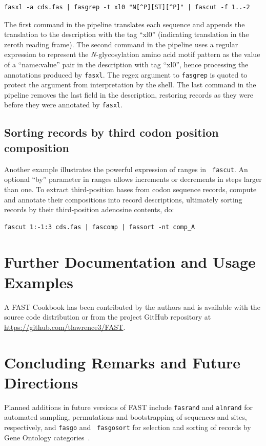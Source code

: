 \documentclass{frontiersSCNS} %
\begin{document}
\begin{verbatim}
fasxl -a cds.fas | fasgrep -t xl0 "N[^P][ST][^P]" | fascut -f 1..-2
\end{verbatim}
 
The first command in the pipeline translates each sequence and appends
the translation to the description with the tag ``xl0'' (indicating
translation in the zeroth reading frame). The second command in the
pipeline uses a regular expression to represent the {\it
  N}-glycosylation amino acid motif pattern as the value of a
``name:value'' pair in the description with tag ``xl0'', hence
processing the annotations produced by {\tt fasxl}. The regex argument
to {\tt fasgrep} is quoted to protect the argument from interpretation
by the shell. The last command in the pipeline removes the last field
in the description, restoring records as they were before they were
annotated by {\tt fasxl}.

\subsection{Sorting records by third codon position composition}

Another example illustrates the powerful expression of ranges in {\tt
  fascut}. An optional ``by'' parameter in ranges allows increments or
decrements in steps larger than one. To extract third-position bases
from codon sequence records, compute and annotate their compositions
into record descriptions, ultimately sorting records by
their third-position adenosine contents, do:

\begin{verbatim}
fascut 1:-1:3 cds.fas | fascomp | fassort -nt comp_A
\end{verbatim}

\section{Further Documentation and Usage Examples}

A FAST Cookbook has been contributed by the authors and is available
with the source code distribution or from the project GitHub
repository at \url{https://github.com/tlawrence3/FAST}.

\section{Concluding Remarks and Future Directions}

Planned additions in future versions of FAST include {\tt fasrand} and
{\tt alnrand} for automated sampling, permutations and bootstrapping
of sequences and sites, respectively, and {\tt fasgo} and {\tt
  fasgosort} for selection and sorting of records by Gene Ontology
categories~\citep{GO_Consortium28012015}. 
\end{document}
